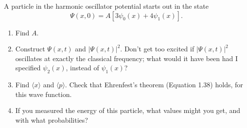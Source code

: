 \documentclass[en, oneside]{vivi}
\begin{document}
\begin{prob}
    A particle in the harmonic oscillator potential starts out in the state
    \begin{equation*}
        \Psi(x, 0) = A \left[ 3\psi_0(x) + 4\psi_1(x) \right].
    \end{equation*}
    \begin{enumerate}[label=(\alph*)]
        \item Find $A$.
        \item Construct $\Psi(x, t)$ and $|\Psi(x, t)|^2$. Don’t get too excited if $|\Psi(x, t)|^2$ oscillates at exactly the classical frequency; what would it have been had I specified $\psi_2(x)$, instead of $\psi_1(x)$?
        \item Find $\langle x \rangle$ and $\langle p \rangle$. Check that Ehrenfest’s theorem (Equation 1.38) holds, for this wave function.
        \item If you measured the energy of this particle, what values might you get, and with what probabilities?
    \end{enumerate}
\end{prob}
\end{document}
